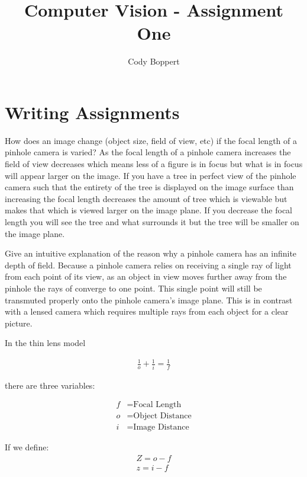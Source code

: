 \documentclass{jhwhw}
\begin{document}
\title{Computer Vision - Assignment One}
\author{Cody Boppert}

\maketitle

\section{Writing Assignments}

How does an image change (object size, field of view, etc) if the focal length of a pinhole camera is varied?
\solution
As the focal length of a pinhole camera increases the field of view decreases which means less of a figure is in focus but what is in focus will appear larger on the image. If you have a tree in perfect view of the pinhole camera such that the entirety of the tree is displayed on the image surface than increasing the focal length decreases the amount of tree which is viewable but makes that which is viewed larger on the image plane. If you decrease the focal length you will see the tree and what surrounds it but the tree will be smaller on the image plane.

Give an intuitive explanation of the reason why a pinhole camera has an infinite depth of field.
\solution
Because a pinhole camera relies on receiving a single ray of light from each point of its view, as an object in view moves further away from the pinhole the rays of converge to one point. This single point will still be transmuted properly onto the pinhole camera's image plane. This is in contrast with a lensed camera which requires multiple rays from each object for a clear picture.

In the thin lens model

\begin{align*}
\frac{1}{o} + \frac{1}{i} = \frac{1}{f}
\end{align*}

there are three variables:

\begin{align*}
f &= \mbox{Focal Length}\\
o &= \mbox{Object Distance}\\
i &= \mbox{Image Distance}
\end{align*}

If we define:
\begin{align*}
Z = o - f\\
z = i - f\\
\end{align*}
\end{document}
